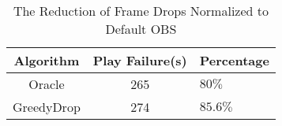 \begin{table}[tb]
\centering
\caption{The Reduction of Frame Drops Normalized to Default OBS}
\label{tab_drop}
{\setlength{\tabcolsep}{1pt}
\begin{tabular}{|c|c|l|}
\hline
\textbf{Algorithm} &\textbf{Play Failure(s)} & \textbf{Percentage}    \\ \hline
Oracle    &265    &$80\%$           \\ \hline
GreedyDrop  &274  &$85.6\%$              \\ \hline
\end{tabular}}
\end{table}
